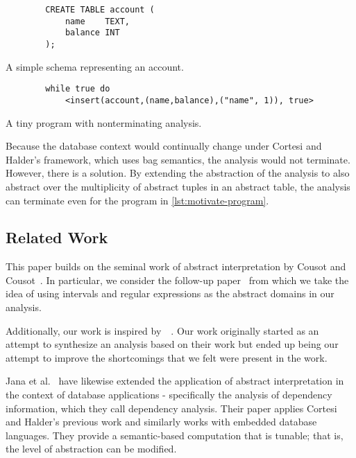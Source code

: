 \begin{listing}
    \begin{verbatim}
        CREATE TABLE account (
            name    TEXT,
            balance INT
        );
    \end{verbatim}
    \caption{A simple schema representing an account.}
    \label{lst:motivate-sql}
\end{listing}


\begin{listing}
    \begin{verbatim}
        while true do
            <insert(account,(name,balance),("name", 1)), true>
    \end{verbatim}
    \caption{A tiny program with nonterminating analysis.}
    \label{lst:motivate-program}
\end{listing}

Because the database context would continually change under Cortesi and Halder's framework, which uses bag semantics, the analysis would not terminate.
However, there is a solution.
By extending the abstraction of the analysis to also abstract over the multiplicity of abstract tuples in an abstract table, the analysis can terminate even for the program in \autoref{lst:motivate-program}.

\subsection{Related Work}\label{subsec:related-work}
This paper builds on the seminal work of abstract interpretation by Cousot and Cousot~\cite{cousot_abstract_1977}.
In particular, we consider the follow-up paper~\cite{cousot_abstract_1996} from which we take the idea of using intervals and regular expressions as the abstract domains in our analysis.

Additionally, our work is inspired by~~\cite{halder_abstract_2012}.
Our work originally started as an attempt to synthesize an analysis based on their work but ended up being our attempt to improve the shortcomings that we felt were present in the work.


Jana et al.~\cite{jana_extending_2020} have likewise extended the application of abstract interpretation in the context of database applications - specifically the analysis of dependency information, which they call dependency analysis.
Their paper applies Cortesi and Halder's previous work and similarly works with embedded database languages.
They provide a semantic-based computation that is tunable; that is, the level of abstraction can be modified.

